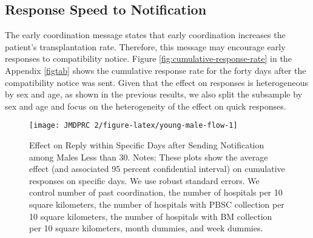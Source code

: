 \documentclass[12pt, a4paper]{article}
\begin{document}
\hypertarget{reply-speed}{%
\subsection{Response Speed to Notification}\label{reply-speed}}

The early coordination message states that early coordination increases the patient's transplantation rate. Therefore, this message may encourage early responses to compatibility notice. Figure \ref{fig:cumulative-response-rate} in the Appendix \ref{figtab} shows the cumulative response rate for the forty days after the compatibility notice was sent. Given that the effect on responses is heterogeneous by sex and age, as shown in the previous results, we also split the subsample by sex and age and focus on the heterogeneity of the effect on quick responses.

\begin{figure}[t]
\texttt{[image: JMDPRC~2/figure-latex/young-male-flow-1]} \caption{Effect on Reply within Specific Days after Sending Notification among Males Less than 30. Notes: These plots show the average effect (and associated 95 percent confidential interval) on cumulative responses on specific days. We use robust standard errors. We control number of past coordination, the number of hospitals per 10 square kilometers, the number of hospitals with PBSC collection per 10 square kilometers, the number of hospitals with BM collection per 10 square kilometers, month dummies, and week dummies.}\label{fig:young-male-flow}
\end{figure}
\end{document}
